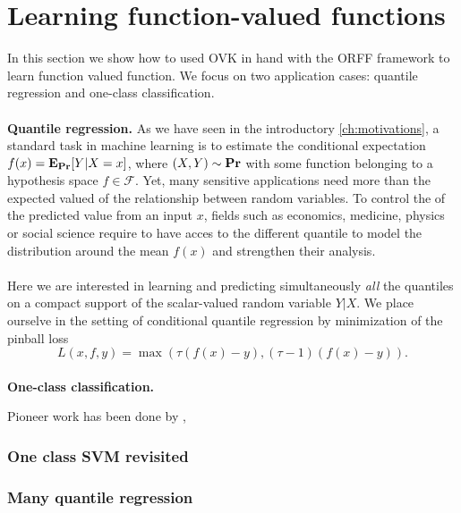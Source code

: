 \section{Learning function-valued functions}
In this section we show how to used \acs{OVK} in hand with the \acs{ORFF}
framework to learn function valued function. We focus on two application cases:
quantile regression and one-class classification.
\paragraph{}
\textbf{Quantile regression.} As we have seen in the introductory
\cref{ch:motivations}, a standard task in machine learning is to estimate the
conditional expectation $f(x)={\mathbf{{E}}}_{{\mathbf{{Pr}}}}[Y | X = x]$, where
$(X,Y)\sim{\mathbf{{Pr}}}$ with some function belonging to a hypothesis space
$f\in\mathcal{F}$. Yet, many sensitive applications need more than the expected
valued of the relationship between random variables. To control the
 of the predicted value from an input $x$, fields such as
economics, medicine, physics or social science require to have acces to the
different quantile to model the distribution around the mean $f(x)$ and
strengthen their analysis.
\paragraph{}
Here we are interested in learning and predicting simultaneously \emph{all} the
quantiles on a compact support of the scalar-valued random variable $Y|X$. We
place ourselve in the setting of conditional quantile regression by minimization
of the pinball loss \citep{koenker1978regression}
\begin{dmath*}
    L(x, f, y) = \max(\tau (f(x) - y), (\tau - 1) (f(x) - y)).
\end{dmath*}

\paragraph{}
\textbf{One-class classification.}

Pioneer work has been done by
\citet{kadri2015operator},


\subsubsection{One class SVM revisited}

\subsubsection{Many quantile regression}

